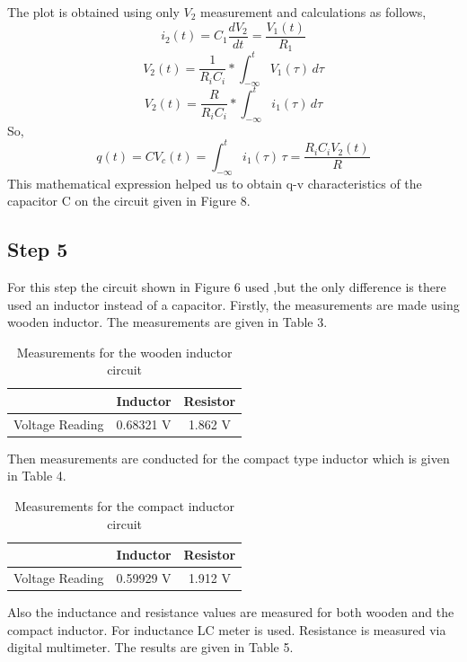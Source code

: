 \documentclass[letterpaper,12pt]{article}
\begin{document}
The plot is obtained using only \(V_2\) measurement and calculations as follows,
\[ i_2(t) = C_1 \frac{d V_2}{dt} = \frac{V_1(t)}{R_1}
\]
\[
	V_2(t) = \frac{1}{R_i C_i} * \int_{-\infty}^{t} V_1(\tau) \, d\tau
	\]
	\[
		V_2(t) = \frac{R}{R_i C_i} * \int_{-\infty}^{t} i_1(\tau) \, d\tau
		\]
So, 
\[ q(t) = C V_c(t) = \int_{-\infty}^{t} i_1(\tau) \,\tau = \frac{R_i C_i V_2(t)}{R} \]
This mathematical expression helped us to obtain q-v characteristics of the capacitor C on the circuit given in Figure 8.

\subsection{Step 5}
For this step the circuit shown in Figure 6 used ,but the only difference is there used an inductor instead of a capacitor. Firstly, the measurements are made using wooden inductor. The measurements are given in Table 3.
\begin{table}[H]
	\begin{center}
		\caption{Measurements for the wooden inductor circuit}
		\vspace{2mm}
		\begin{tabular}{||c | c | c||} 
		 \hline
		   & Inductor & Resistor \\ [0.5ex] 
		 \hline\hline
		 Voltage Reading & 0.68321 V & 1.862 V \\
		 \hline
		\end{tabular}
\end{center}
\end{table}
Then measurements are conducted for the compact type inductor which is given in Table 4.
\begin{table}[H]
	\begin{center}
		\caption{Measurements for the compact inductor circuit}
		\vspace{2mm}
		\begin{tabular}{||c | c | c||} 
		 \hline
		   & Inductor & Resistor \\ [0.5ex] 
		 \hline\hline
		 Voltage Reading & 0.59929 V & 1.912 V \\
		 \hline

		\end{tabular}
\end{center}
\end{table}
Also the inductance and resistance values are measured for both wooden and the compact inductor. For inductance LC meter is used. Resistance is measured via digital multimeter. The results are given in Table 5.
\end{document}

